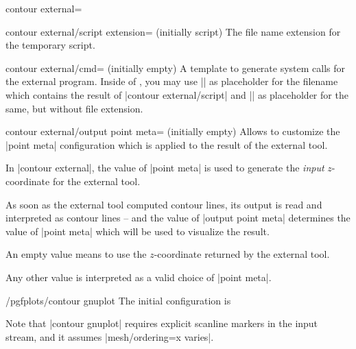 {{\begin{plottype}[/pgfplots]{
    contour external=\textcolor{black}{}%
}
    \begin{pgfplotskey}{contour external/script extension= (initially script)}
        The file name extension for the temporary script.
    \end{pgfplotskey}

    \begin{pgfplotskey}{contour external/cmd= (initially empty)}
        A template to generate system calls for the external program. Inside of
        , you may use |\script| as placeholder for the
        filename which contains the result of |contour external/script| and |\scriptbase| as placeholder for the same, but without file extension.
    \end{pgfplotskey}

    \begin{pgfplotskey}{contour external/output point meta= (initially empty)}
        Allows to customize the |point meta| configuration which is applied to
        the result of the external tool.

        In |contour external|, the value of |point meta| is used to generate
        the \emph{input} $z$-coordinate for the external tool.

        As soon as the external tool computed contour lines, its output is read
        and interpreted as contour lines -- and the value of
        |output point meta| determines the value of |point meta| which will be
        used to visualize the result.

        An empty value means to use the $z$-coordinate returned by the external
        tool.

        Any other value is interpreted as a valid choice of |point meta|.
    \end{pgfplotskey}

    \begin{stylekey}{/pgfplots/contour gnuplot}
    \label{key:pgfplots:contour:gnuplot}
        The initial configuration is
\begin{codeexample}
\end{codeexample}
        Note that |contour gnuplot| requires explicit scanline markers in the
        input stream, and it assumes |mesh/ordering=x varies|.
    \end{stylekey}


\end{plottype}}}
